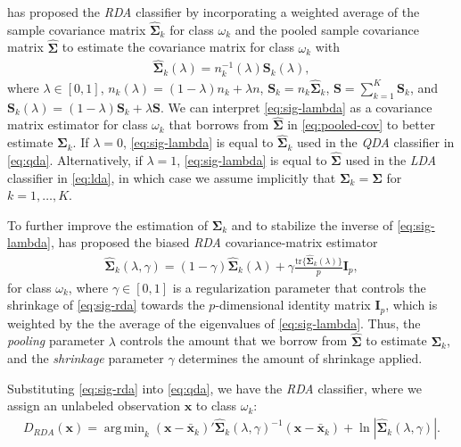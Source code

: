 \documentclass[11pt]{article}
\newcommand{\xbar}{\bar{\bm x}}
\newcommand{\tr}{\text{tr}}
\DeclareMathOperator*{\argmin}{arg\,min}
\begin{document}
\cite{Friedman:1989tm} has proposed the \emph{RDA} classifier by incorporating a weighted average of the sample covariance matrix $\widehat{\bm \Sigma}_k$ for class $\omega_k$ and the pooled sample covariance matrix $\widehat{\bm\Sigma}$ to estimate the covariance matrix for class $\omega_k$ with
\begin{align}
  \widehat{\bm\Sigma}_k(\lambda) = n_k^{-1}(\lambda) \bm S_k(\lambda),\label{eq:sig-lambda}
\end{align}
where $\lambda \in [0, 1]$, $n_k(\lambda) = (1 - \lambda) n_k + \lambda n$, $\bm S_k = n_k \widehat{\bm\Sigma}_k$, $\bm S = \sum_{k=1}^K \bm S_k$, and $\bm S_k(\lambda) = (1 - \lambda) \bm S_k + \lambda \bm S$. We can interpret \eqref{eq:sig-lambda} as a covariance matrix estimator for class $\omega_k$ that borrows from $\widehat{\bm\Sigma}$ in \eqref{eq:pooled-cov} to better estimate $\bm \Sigma_k$. If $\lambda = 0$, \eqref{eq:sig-lambda} is equal to $\widehat{\bm\Sigma}_k$ used in the \emph{QDA} classifier in \eqref{eq:qda}. Alternatively, if $\lambda = 1$, \eqref{eq:sig-lambda} is equal to $\widehat{\bm\Sigma}$ used in the \emph{LDA} classifier in \eqref{eq:lda}, in which case we assume implicitly that $\bm\Sigma_k = \bm \Sigma$ for $k = 1, \ldots, K$.

To further improve the estimation of $\bm \Sigma_k$ and to stabilize the inverse of \eqref{eq:sig-lambda}, \cite{Friedman:1989tm} has proposed the biased \emph{RDA} covariance-matrix estimator
\begin{align}
	\widehat{\bm\Sigma}_k(\lambda, \gamma) = (1 - \gamma) \widehat{\bm\Sigma}_k(\lambda) + \gamma \frac{\tr\{\widehat{\bm\Sigma}_k(\lambda)\}}{p} \bm I_p,\label{eq:sig-rda}
\end{align}
for class $\omega_k$, where $\gamma \in [0, 1]$ is a regularization parameter that controls the shrinkage of \eqref{eq:sig-rda}  towards the $p$-dimensional identity matrix $\bm I_p$, which is weighted by the the average of the eigenvalues of \eqref{eq:sig-lambda}. Thus, the \emph{pooling} parameter $\lambda$ controls the amount that we borrow from $\widehat{\bm\Sigma}$ to estimate $\bm \Sigma_k$, and the \emph{shrinkage} parameter $\gamma$ determines the amount of shrinkage applied.

Substituting \eqref{eq:sig-rda} into \eqref{eq:qda}, we have the \emph{RDA} classifier, where we assign an unlabeled observation $\bm x$ to class $\omega_k$:
\begin{align}
	D_{RDA}(\bm x) = \argmin_{k}  (\bm x - \xbar_k)'\widehat{\bm\Sigma}_k(\lambda, \gamma)^{-1}(\bm x - \xbar_k)  + \ln |\widehat{\bm\Sigma}_k(\lambda, \gamma)|. \label{eq:rda}
\end{align}
\end{document}
